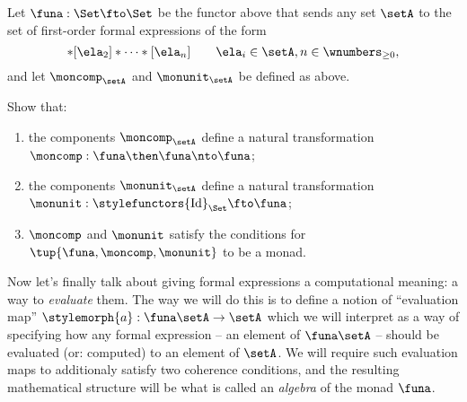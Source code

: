 \begin{gradedexercise}
	\label{ex:ListMonad}
	Let $\funa : \Set \fto \Set$ be the functor above that sends any set $\setA$ to the set of first-order formal expressions of the form
	\begin{equation*}
		[\ela_1]
		* [\ela_2] * \cdots * [\ela_n] \quad \quad \ela_i \in \setA, n \in \wnumbers_{\geq 0},
	\end{equation*}
	and let $\moncomp_\setA$ and $\monunit_\setA$ be defined as above.

	Show that:
	\begin{enumerate}
		\item the components $\moncomp_\setA$ define a natural transformation $\moncomp : \funa \then \funa \nto \funa$;
		\item the components $\monunit_\setA$ define a natural transformation $\monunit : \stylefunctors{\text{Id}}_{\Set} \fto \funa$;
		\item $\moncomp$ and $\monunit$ satisfy the conditions for $\tup{\funa, \moncomp, \monunit}$ to be a monad.
	\end{enumerate}
\end{gradedexercise}


Now let's finally talk about giving formal expressions a computational meaning: a way to \emph{evaluate} them.
The way we will do this is to define a notion of ``evaluation map'' $\stylemorph{a}: \funa \setA \to \setA$ which we will interpret as a way of specifying how any formal expression -- an element of $\funa \setA$ -- should be evaluated (or: computed) to an element of $\setA$.
We will require such evaluation maps to additionaly satisfy two coherence conditions, and the resulting mathematical structure will be what is called an \emph{algebra} of the monad $\funa$.


